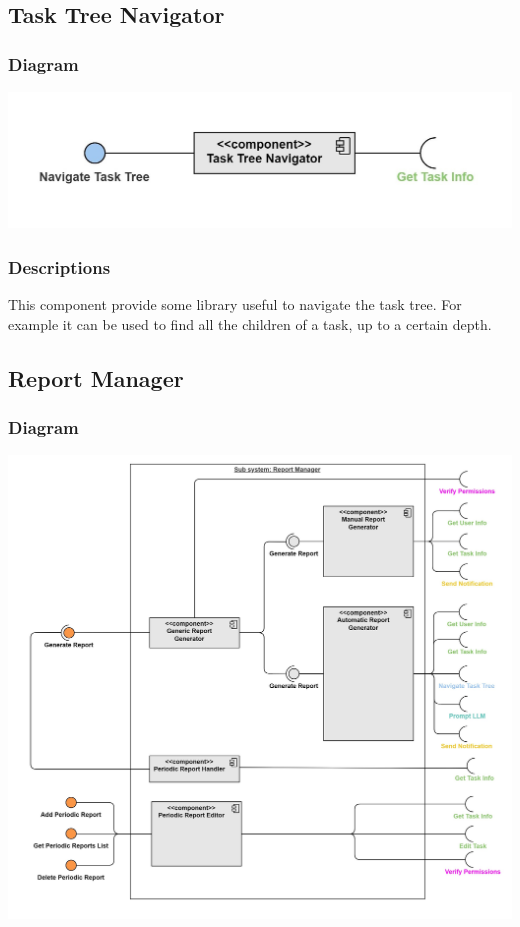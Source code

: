 \documentclass{article}
\begin{document}
\subsection{Task Tree Navigator}
\subsubsection{Diagram}
\includegraphics[width=\textwidth,height=\textheight,keepaspectratio]{images/component_diagram/task_tree_navigator.jpg}
\subsubsection{Descriptions}
This component provide some library useful to navigate the task tree. For example it can be used to find all the children of a task, up to a certain depth.

\subsection{Report Manager}
\subsubsection{Diagram}
\includegraphics[width=\textwidth,height=\textheight,keepaspectratio]{images/component_diagram/report_manager.jpg}
\end{document}
